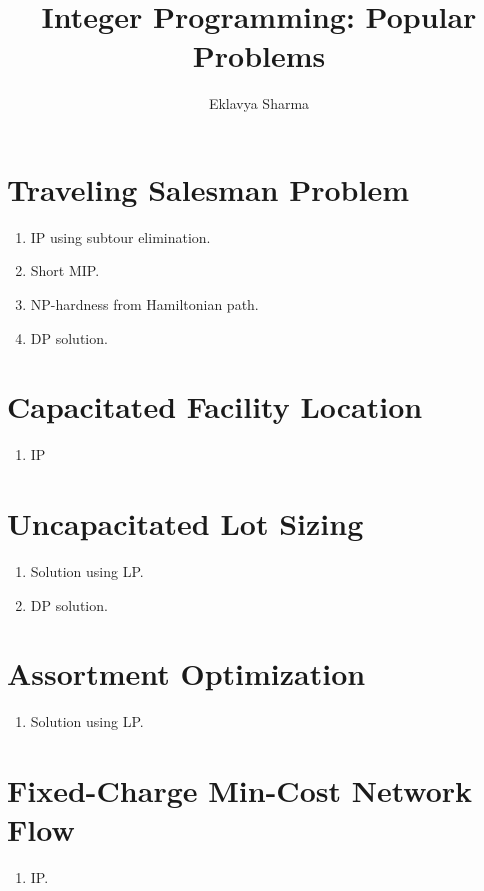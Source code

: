 \documentclass[a4paper,12pt,fleqn]{article}
\author{Eklavya Sharma}
\date{\empty}
\title{Integer Programming: Popular Problems}
\begin{document}
\maketitle
\setlength{\parskip}{0.2em}

\section{Traveling Salesman Problem}

\begin{enumerate}
\item IP using subtour elimination.
\item Short MIP.
\item NP-hardness from Hamiltonian path.
\item DP solution.
\end{enumerate}

\section{Capacitated Facility Location}

\begin{enumerate}
\item IP
\end{enumerate}

\section{Uncapacitated Lot Sizing}

\begin{enumerate}
\item Solution using LP.
\item DP solution.
\end{enumerate}

\section{Assortment Optimization}

\begin{enumerate}
\item Solution using LP.
\end{enumerate}

\section{Fixed-Charge Min-Cost Network Flow}

\begin{enumerate}
\item IP.
\end{enumerate}
\end{document}
